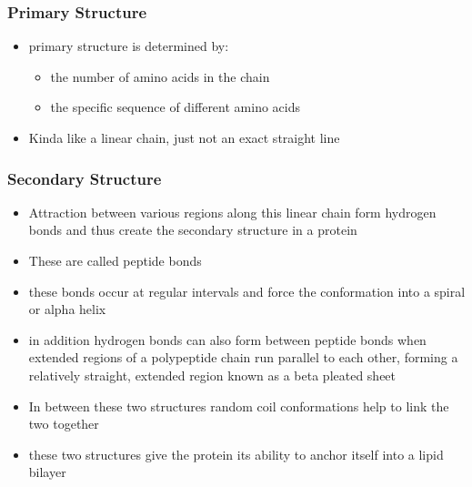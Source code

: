 \documentclass[11pt]{article}
\begin{document}
\subsubsection{Primary Structure}
\label{sec:org03c896c}
\begin{itemize}
\item primary structure is determined by:
\begin{itemize}
\item the number of amino acids in the chain
\item the specific sequence of different amino acids
\end{itemize}
\item Kinda like a linear chain, just not an exact straight line
\end{itemize}
\subsubsection{Secondary Structure}
\label{sec:org648f76a}
\begin{itemize}
\item Attraction between various regions along this linear chain form hydrogen bonds and thus create the secondary structure in a protein
\item These are called peptide bonds
\item these bonds occur at regular intervals and force the conformation into a spiral or alpha helix
\item in addition hydrogen bonds can also form between peptide bonds when extended regions of a polypeptide chain run parallel to each other, forming a relatively straight, extended region known as a beta pleated sheet
\item In between these two structures random coil conformations help to link the two together
\item these two structures give the protein its ability to anchor itself into a lipid bilayer
\end{itemize}
\end{document}
